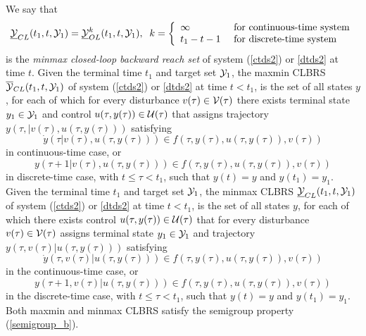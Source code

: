 We say that
\begin{equation}
\UYCL(t_1, t, \YY_1) = \UYOL^k(t_1, t, \YY_1), \;\;
k = \left\{\begin{array}{ll}
\infty & \mbox{ for continuous-time system}\\
t_1-t-1 & \mbox{ for discrete-time system}\end{array}\right.
\label{minmaxclbrs}
\end{equation}
is the \emph{minmax closed-loop backward reach set}
of system (\ref{ctds2}) or \ref{dtds2} at time $t$.
Given the terminal time $t_1$ and target set $\YY_1$, the
maxmin CLBRS $\OYCL(t_1, t, \YY_1)$ of
system (\ref{ctds2}) or \ref{dtds2} at time $t<t_1$,
is the set of all states $y$, for each of which for every disturbance
$v(\tau)\in\VV(\tau)$ there exists terminal state $y_1\in\YY_1$ and
control $u(\tau, y(\tau))\in\UU(\tau)$ that assigns
trajectory $y(\tau, | v(\tau), u(\tau, y(\tau)))$ satisfying
\[ \dot{y}(\tau | v(\tau), u(\tau, y(\tau))) \in
f(\tau, y(\tau), u(\tau, y(\tau)), v(\tau)) \]
in continuous-time case, or
\[ y(\tau+1 | v(\tau), u(\tau, y(\tau))) \in
f(\tau, y(\tau), u(\tau, y(\tau)), v(\tau)) \]
in discrete-time case, with $t\leq\tau<t_1$, such that
$y(t) = y$ and $y(t_1)=y_1$.
\label{def_maxminclbrs}
\ed
{}
Given the terminal time $t_1$ and target set $\YY_1$, the
minmax CLBRS $\UYCL(t_1, t, \YY_1)$ of
system (\ref{ctds2}) or \ref{dtds2} at time $t<t_1$,
is the set of all states $y$, for each of which there exists control
$u(\tau, y(\tau))\in\UU(\tau)$ that for every disturbance
$v(\tau)\in\VV(\tau)$
assigns terminal state $y_1\in\YY_1$ and trajectory
$y(\tau, v(\tau) | u(\tau, y(\tau)))$ satisfying
\[ \dot{y}(\tau, v(\tau) | u(\tau, y(\tau))) \in
f(\tau, y(\tau), u(\tau, y(\tau)), v(\tau)) \]
in the continuous-time case, or
\[ y(\tau+1, v(\tau) | u(\tau, y(\tau))) \in
f(\tau, y(\tau), u(\tau, y(\tau)), v(\tau)) \]
in the discrete-time case, with $t\leq\tau<t_1$, such that
$y(t) = y$ and $y(t_1)=y_1$.
\label{def_minmaxclbrs}
\ed
Both maxmin and minmax CLBRS satisfy the semigroup property (\ref{semigroup_b}).

